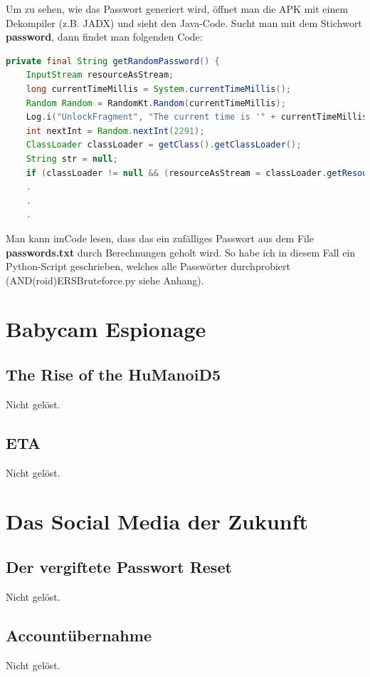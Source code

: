 \documentclass[12pt, a4paper, titlepage, oneside]{scrartcl}
\begin{document}
    \noindent Um zu sehen, wie das Passwort generiert wird, öffnet man die APK mit einem Dekompiler (z.B. JADX) und sieht den Java-Code. Sucht man mit dem Stichwort \textbf{password}, dann findet man folgenden Code:
    \begin{lstlisting}[language=java]
    private final String getRandomPassword() {
    InputStream resourceAsStream;
    long currentTimeMillis = System.currentTimeMillis();
    Random Random = RandomKt.Random(currentTimeMillis);
    Log.i("UnlockFragment", "The current time is '" + currentTimeMillis + "'");
    int nextInt = Random.nextInt(2291);
    ClassLoader classLoader = getClass().getClassLoader();
    String str = null;
    if (classLoader != null && (resourceAsStream = classLoader.getResourceAsStream("passwords.txt")) != null)
    .
    .
    .
    \end{lstlisting}
    Man kann imCode lesen, dass das ein zufälliges Passwort aus dem File \textbf{passwords.txt} durch Berechnungen geholt wird. So habe ich in diesem Fall ein Python-Script geschrieben, welches alle Passwörter durchprobiert (AND(roid)ERSBruteforce.py siehe Anhang).

	\section{Babycam Espionage}

	\subsection{The Rise of the HuManoiD5}
	Nicht gelöst.

	\subsection{ETA}
	Nicht gelöst.

	\section{Das Social Media der Zukunft}

	\subsection{Der vergiftete Passwort Reset}
	Nicht gelöst.

	\subsection{Accountübernahme}
	Nicht gelöst.
\end{document}
